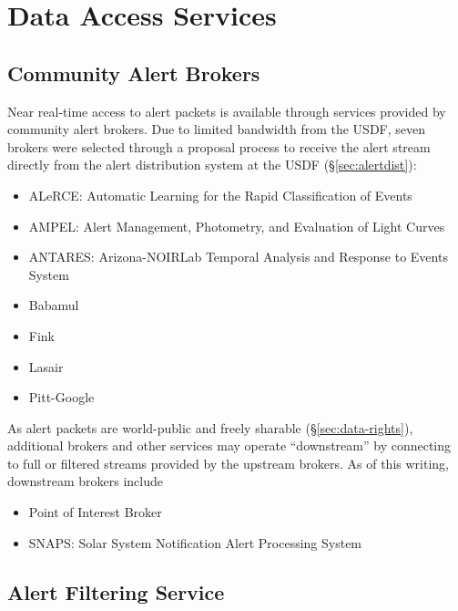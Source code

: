 \section{Data Access Services} \label{sec:services}

\subsection{Community Alert Brokers} \label{sec:brokers}

Near real-time access to alert packets is available through services provided by community alert brokers.
Due to limited bandwidth from the USDF, seven brokers were selected through a proposal process \citep{LDM-612} to receive the alert stream directly from the alert distribution system at the USDF (\S \ref{sec:alertdist}):  

\begin{itemize}
    \item ALeRCE: Automatic Learning for the Rapid Classification of Events \citep{Forster:21:ALeRCE}
    \item AMPEL: Alert Management, Photometry, and Evaluation of Light Curves \citep{Nordin:19:AMPEL}
    \item ANTARES: Arizona-NOIRLab Temporal Analysis and Response to Events System \citep{Matheson:21:ANTARES}
    \item Babamul  \citep{2025arXiv251100164J}
    \item Fink \citep{Moller:21:FINK}
    \item Lasair \citep{Smith:19:Lasair}
    \item Pitt-Google
\end{itemize}

As alert packets are world-public and freely sharable (\S \ref{sec:data-rights}), additional brokers and other services may operate ``downstream'' by connecting to full or filtered streams provided by the upstream brokers.
As of this writing, downstream brokers include

\begin{itemize}
    \item Point of Interest Broker
    \item SNAPS: Solar System Notification Alert Processing System 
\end{itemize}


\subsection{Alert Filtering Service}

